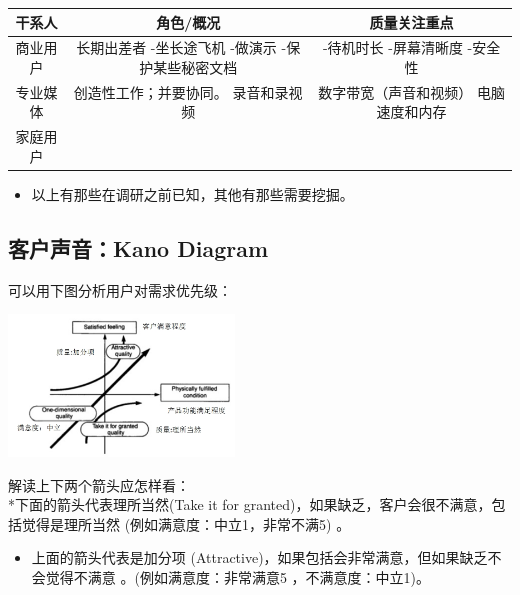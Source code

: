 

\begin{tabular}{|c|c|c|}
\hline
干系人&角色/概况&质量关注重点\\
\hline
商业用户&长期出差者
-坐长途飞机
-做演示
-保护某些秘密文档&-待机时长
-屏幕清晰度
-安全性 \\
\hline
专业媒体&创造性工作；并要协同。
录音和录视频&数字带宽（声音和视频）
电脑速度和内存  \\
\hline
家庭用户&\:&\:\\
\hline
\end{tabular}

\begin{itemize}
\tightlist
\item
  以上有那些在调研之前已知，其他有那些需要挖掘。
\end{itemize}

\hypertarget{ux5ba2ux6237ux58f0ux97f3kano-diagram}{%
\subsection{客户声音：Kano
Diagram}\label{ux5ba2ux6237ux58f0ux97f3kano-diagram}}

可以用下图分析用户对需求优先级：


\includegraphics[width=6cm]{IcKanoDiagramScreenshot_2022-12-17_1208452.jpg}

解读上下两个箭头应怎样看：\\
*下面的箭头代表理所当然(Take it for
granted)，如果缺乏，客户会很不满意，包括觉得是理所当然
(例如满意度：中立1，非常不满5) 。

\begin{itemize}
\tightlist
\item
  上面的箭头代表是加分项
  (Attractive)，如果包括会非常满意，但如果缺乏不会觉得不满意
  。(例如满意度：非常满意5 ，不满意度：中立1)。
\end{itemize}

